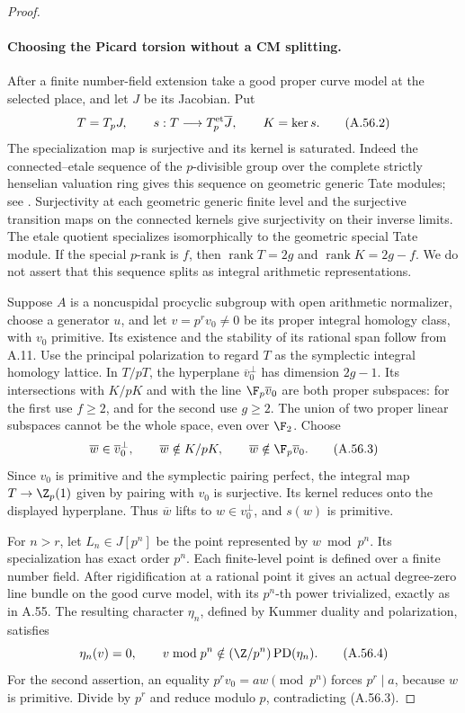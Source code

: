 \begin{proof}
\paragraph{Choosing the Picard torsion without a CM splitting.}
After a finite number-field extension take a good proper curve
model at the selected place, and let \(J\) be its Jacobian.
Put
\[
 T=T_pJ,\qquad
 s:T\longrightarrow T_p^{\rm et}\overline J,
 \qquad K=\ker s.                                    \tag{A.56.2}
\]
The specialization map is surjective and its kernel is saturated.
Indeed the connected--etale sequence of the \(p\)-divisible group
over the complete strictly henselian valuation ring gives this
sequence on geometric generic Tate modules; see
\cite[Sections 1.4 and 2.2, printed pp.160 and164,
and Section 2.4, p.169]{fghTate1967Pdivisible}.
Surjectivity at each geometric generic finite level and the
surjective transition maps on the connected kernels give
surjectivity on their inverse limits. The etale quotient
specializes isomorphically to the geometric special Tate module.
If the special \(p\)-rank is \(f\), then
\(\operatorname{rank}T=2g\) and
\(\operatorname{rank}K=2g-f\). We do not assert that this
sequence splits as integral arithmetic representations.

Suppose \(A\) is a noncuspidal procyclic subgroup with open
arithmetic normalizer, choose a generator \(u\), and let
\(v=p^r v_0\ne0\) be its proper integral homology class,
with \(v_0\) primitive. Its existence and the stability of
its rational span follow from A.11. Use the principal
polarization to regard \(T\) as the symplectic integral
homology lattice. In \(T/pT\), the hyperplane
\(\overline v_0^\perp\) has dimension \(2g-1\).
Its intersections with \(K/pK\) and with the line
\(\F_p\overline v_0\) are both proper subspaces: for the
first use \(f\ge2\), and for the second use \(g\ge2\).
The union of two proper linear subspaces cannot be the whole
space, even over \(\F_2\). Choose
\[
 \overline w\in\overline v_0^\perp,
 \qquad \overline w\notin K/pK,
 \qquad \overline w\notin\F_p\overline v_0.             \tag{A.56.3}
\]
Since \(v_0\) is primitive and the symplectic pairing perfect,
the integral map \(T\to\Z_p(1)\) given by pairing with
\(v_0\) is surjective. Its kernel reduces onto the displayed
hyperplane. Thus \(\overline w\) lifts to
\(w\in v_0^\perp\), and \(s(w)\) is primitive.

For \(n>r\), let \(L_n\in J[p^n]\) be the point represented
by \(w\bmod p^n\). Its specialization has exact order
\(p^n\). Each finite-level point is defined over a finite
number field. After rigidification at a rational point it gives
an actual degree-zero line bundle on the good curve model,
with its \(p^n\)-th power trivialized, exactly as in A.55.
The resulting character \(\eta_n\), defined by Kummer
duality and polarization, satisfies
\[
       \eta_n(v)=0,
       \qquad v\bmod p^n\notin
               (\Z/p^n)\operatorname{PD}(\eta_n).     \tag{A.56.4}
\]
For the second assertion, an equality
\(p^r v_0=a w\pmod {p^n}\) forces \(p^r\mid a\),
because \(w\) is primitive. Divide by \(p^r\) and reduce
modulo \(p\), contradicting (A.56.3).


\end{proof}
